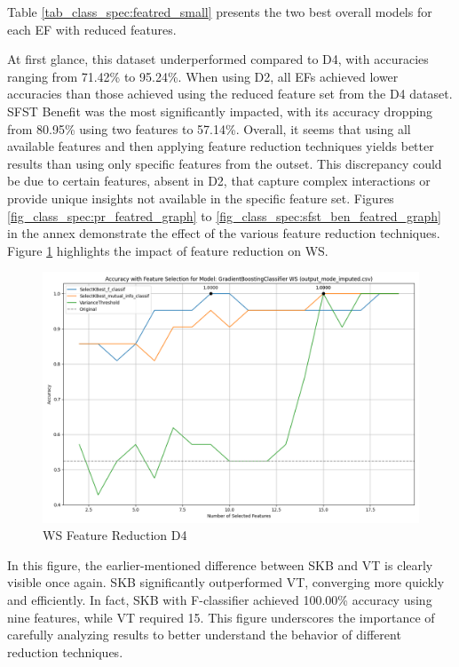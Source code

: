 \documentclass[12pt,letterpaper]{article}
\begin{document}
Table \ref{tab_class_spec:featred_small} presents the two best overall models for each \ac{EF} with reduced features.



At first glance, this dataset underperformed compared to D4, with accuracies ranging from 71.42\% to 95.24\%.
When using D2, all \acp{EF} achieved lower accuracies than those achieved using the reduced feature set from the D4 dataset.
\ac{SFST} Benefit was the most significantly impacted, with its accuracy dropping from 80.95\% using two features to 57.14\%.
Overall, it seems that using all available features and then applying feature reduction techniques yields better results than using only specific features from the outset.
This discrepancy could be due to certain features, absent in D2, that capture complex interactions or provide unique insights not available in the specific feature set.
Figures \ref{fig_class_spec:pr_featred_graph} to \ref{fig_class_spec:sfst_ben_featred_graph} in the annex demonstrate the effect of the various feature reduction techniques.
Figure \ref{class_spec_tab:featred_pr} highlights the impact of feature reduction on \ac{WS}.

\begin{figure}[h]
    \centering
    \includegraphics[width=0.85\linewidth]{class_specific_section/images_class_ensemble_reduction/feature_selection_accuracy_plot_output_mode_imputedcsv_GradientBoostingClassifier_WS.png}
    \caption{WS Feature Reduction D4}
    \label{class_spec_tab:featred_pr}
\end{figure}

In this figure, the earlier-mentioned difference between \ac{SKB} and \ac{VT} is clearly visible once again.
\ac{SKB} significantly outperformed \ac{VT}, converging more quickly and efficiently.
In fact, \ac{SKB} with F-classifier achieved 100.00\% accuracy using nine features, while \ac{VT} required 15.
This figure underscores the importance of carefully analyzing results to better understand the behavior of different reduction techniques.
\end{document}
